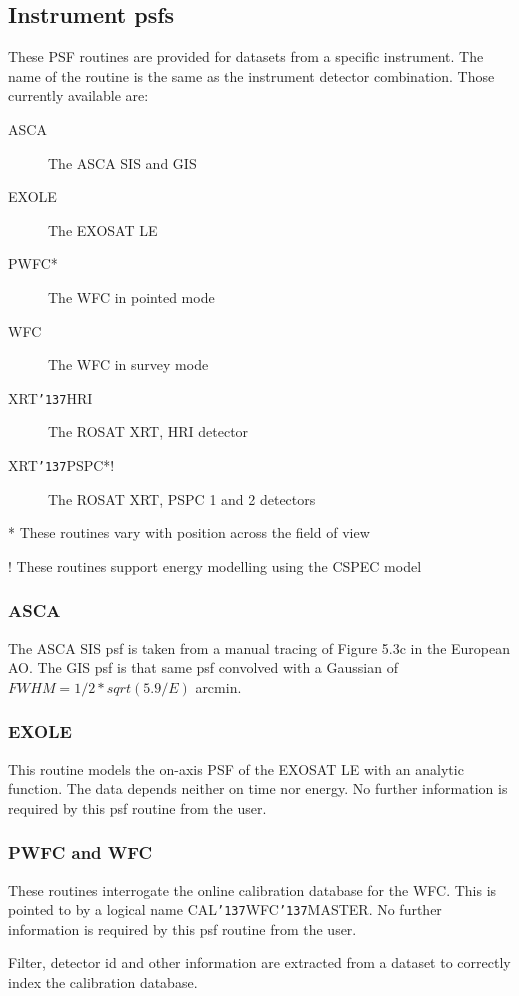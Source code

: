 \documentclass{book}
\renewcommand{\_}{{\tt\char'137}}     %
\begin{document}
\subsection{Instrument psfs}
These PSF routines are provided for datasets from a specific
instrument. The name of the routine is the same as the instrument
detector combination. Those currently available are:


\begin{description}
\item[ASCA]
The ASCA SIS and GIS
\item[EXOLE]
The EXOSAT LE
\item[PWFC*]
The WFC in pointed mode
\item[WFC]
The WFC in survey mode
\item[XRT\_HRI]
The ROSAT XRT, HRI detector
\item[XRT\_PSPC*!]
The ROSAT XRT, PSPC 1 and 2 detectors
\end{description}
* These routines vary with position across the field of view

! These routines support energy modelling using the CSPEC model

\subsubsection{ASCA}
The ASCA SIS psf is taken from a manual tracing of Figure 5.3c in the
European AO. The GIS psf is that same psf convolved with a Gaussian
of $FWHM = 1/2 * sqrt(5.9/E)$ arcmin.

\subsubsection{EXOLE}
This routine models the on-axis PSF of the EXOSAT LE with an
analytic function. The data depends neither on time nor energy.
No further information is required by this psf routine from the
user.

\subsubsection{PWFC and WFC}
These routines interrogate the online calibration database for
the WFC. This is pointed to by a logical name CAL\_WFC\_MASTER.
No further information is required by this psf routine from the
user.

Filter, detector id and other information are extracted from a
dataset to correctly index the calibration database.
\end{document}
